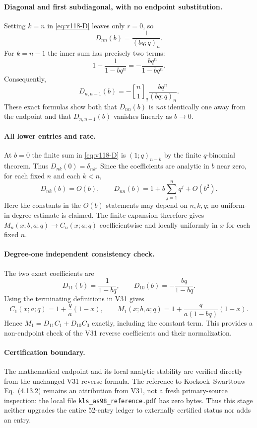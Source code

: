 \documentclass[11pt]{article}
\begin{document}
\paragraph{Diagonal and first subdiagonal, with no endpoint substitution.}
Setting $k=n$ in \eqref{eq:v118-D} leaves only $r=0$, so
\begin{equation}\label{eq:v118-diag}
 \boxed{D_{nn}(b)=\frac{1}{(bq;q)_n}.}
\end{equation}
For $k=n-1$ the inner sum has precisely two terms:
\[
 1-\frac{1}{1-bq^n}=-\frac{bq^n}{1-bq^n}.
\]
Consequently,
\begin{equation}\label{eq:v118-subdiag}
 \boxed{D_{n,n-1}(b)=-{n\brack1}_q\frac{bq^n}{(bq;q)_n}.}
\end{equation}
These exact formulas show both that $D_{nn}(b)$ is \emph{not} identically one away from the endpoint and that $D_{n,n-1}(b)$ vanishes linearly as $b\to0$.

\paragraph{All lower entries and rate.}
At $b=0$ the finite sum in \eqref{eq:v118-D} is $(1;q)_{n-k}$ by the finite $q$-binomial theorem. Thus $D_{nk}(0)=\delta_{nk}$. Since the coefficients are analytic in $b$ near zero, for each fixed $n$ and each $k<n$,
\[
 D_{nk}(b)=O(b),\qquad
 D_{nn}(b)=1+b\sum_{j=1}^n q^j+O(b^2).
\]
Here the constants in the $O(b)$ statements may depend on $n,k,q$; no uniform-in-degree estimate is claimed. The finite expansion therefore gives $M_n(x;b,a;q)\to C_n(x;a;q)$ coefficientwise and locally uniformly in $x$ for each fixed $n$.

\paragraph{Degree-one independent consistency check.}
The two exact coefficients are
\[
 D_{11}(b)=\frac{1}{1-bq},\qquad
 D_{10}(b)=-\frac{bq}{1-bq}.
\]
Using the terminating definitions in V31 gives
\[
 C_1(x;a;q)=1+\frac{q}{a}(1-x),\qquad
 M_1(x;b,a;q)=1+\frac{q}{a(1-bq)}(1-x).
\]
Hence $M_1=D_{11}C_1+D_{10}C_0$ exactly, including the constant term. This provides a non-endpoint check of the V31 reverse coefficients and their normalization.

\paragraph{Certification boundary.}
The mathematical endpoint and its local analytic stability are verified directly from the unchanged V31 reverse formula. The reference to Koekoek--Swarttouw Eq.~(4.13.2) remains an attribution from V31, not a fresh primary-source inspection: the local file \texttt{kls\_as98\_reference.pdf} has zero bytes. Thus this stage neither upgrades the entire 52-entry ledger to externally certified status nor adds an entry.
\end{document}
